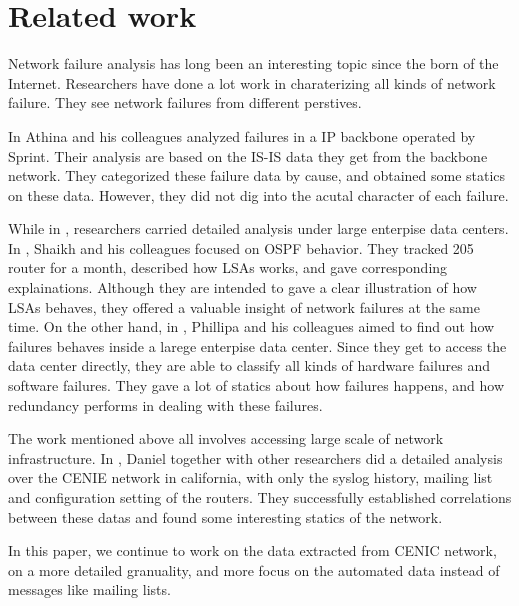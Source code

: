 \documentclass[conference, twocolumn, oneside, 10pt]{IEEEtran}
\begin{document}
\section{Related work}
\label{sec:sec2}

Network failure analysis has long been an interesting topic since the born of
the Internet\cite{Baran_1964}. Researchers have done a lot work in charaterizing all kinds of network failure\cite{  Chandra:2008:CFA:1453175.1453178, Gill:2011:UNF:2018436.2018477, Markopoulou:2008:CFO:1453698.1453699, Shaikh:2002:CSO:637201.637236, turner2010california}. They see network failures from different perstives.

In \cite{Markopoulou:2008:CFO:1453698.1453699} Athina and his colleagues analyzed failures in a IP backbone operated by Sprint. Their analysis are based on the IS-IS data they get from the backbone network. They categorized these failure data by cause, and obtained some statics on these data. However, they did not dig into the acutal character of each failure.

While in \cite{Shaikh:2002:CSO:637201.637236, Gill:2011:UNF:2018436.2018477}, researchers carried detailed analysis under large enterpise data centers. In \cite{Shaikh:2002:CSO:637201.637236}, Shaikh and his colleagues focused on OSPF behavior. They tracked 205 router for a month, described how LSAs works, and gave corresponding explainations. Although they are intended to gave a clear illustration of how LSAs behaves, they offered a valuable insight of network failures at the same time. On the other hand, in \cite{Gill:2011:UNF:2018436.2018477}, Phillipa and his colleagues aimed to find out how failures behaves inside a larege enterpise data center. Since they get to access the data center directly, they are able to classify all kinds of hardware failures and software failures. They gave a lot of statics about how failures happens, and how redundancy performs in dealing with these failures. 

The work mentioned above all involves accessing large scale of network infrastructure. In \cite{turner2010california}, Daniel together with other researchers did a detailed analysis over the CENIE network in california, with only the syslog history, mailing list and configuration setting of the routers. They successfully established correlations between these datas and found some interesting statics of the network.

In this paper, we continue to work on the data extracted from CENIC network, on a more detailed granuality, and more focus on the automated data instead of messages like mailing lists.
\end{document}
